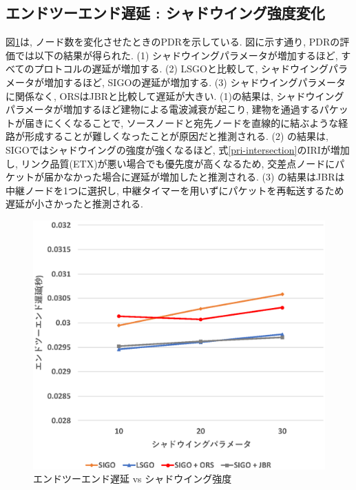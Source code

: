 \documentclass[10pt]{jreport}
\begin{document}
\subsection{エンドツーエンド遅延 : シャドウイング強度変化}
図\ref{fig:SIGO_delay_shadow}は, ノード数を変化させたときのPDRを示している.
図に示す通り, PDRの評価では以下の結果が得られた.
(1) シャドウイングパラメータが増加するほど, すべてのプロトコルの遅延が増加する.
(2) LSGOと比較して, シャドウイングパラメータが増加するほど, SIGOの遅延が増加する.
(3) シャドウイングパラメータに関係なく, ORSはJBRと比較して遅延が大きい. 
(1)の結果は, シャドウイングパラメータが増加するほど建物による電波減衰が起こり, 建物を通過するパケットが届きにくくなることで,  ソースノードと宛先ノードを直線的に結ぶような経路が形成することが難しくなったことが原因だと推測される.
(2) の結果は, SIGOではシャドウイングの強度が強くなるほど, 式\ref{pri-intersection}のIRIが増加し, リンク品質(ETX)が悪い場合でも優先度が高くなるため, 交差点ノードにパケットが届かなかった場合に遅延が増加したと推測される.
(3) の結果はJBRは中継ノードを1つに選択し, 中継タイマーを用いずにパケットを再転送するため遅延が小さかったと推測される.


\begin{figure}[!ht]
	\centering
	\includegraphics[width=120mm]{figures/SIGO_delay_shadow.eps}
	\caption{エンドツーエンド遅延 vs シャドウイング強度}
	\label{fig:SIGO_delay_shadow}
\end{figure}
\end{document}
